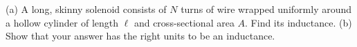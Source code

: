 (a) A long, skinny solenoid consists of $N$ turns of wire wrapped uniformly around a
        hollow cylinder of length $\ell$ and cross-sectional area $A$. Find its
        inductance.\answercheck\hwendpart
        (b) Show that your answer has the right units to be an inductance.
